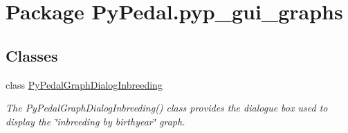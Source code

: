 \hypertarget{namespacePyPedal_1_1pyp__gui__graphs}{
\section{Package Py\-Pedal.pyp\_\-gui\_\-graphs}
\label{namespacePyPedal_1_1pyp__gui__graphs}
}


\subsection*{Classes}
\begin{CompactItemize}
\item 
class \hyperlink{classPyPedal_1_1pyp__gui__graphs_1_1PyPedalGraphDialogInbreeding}{Py\-Pedal\-Graph\-Dialog\-Inbreeding}
\begin{CompactList}\small\item\em The Py\-Pedal\-Graph\-Dialog\-Inbreeding() class provides the dialogue box used to display the \char`\"{}inbreeding by birthyear\char`\"{} graph. \item\end{CompactList}\end{CompactItemize}
